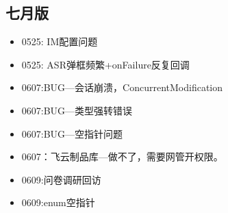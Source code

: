 \documentclass{ctexart}
\begin{document}
	\newpage
	\subsection{七月版}
	\begin{itemize}
		\item 0525: IM配置问题
		\item 0525: ASR弹框频繁+onFailure反复回调
		
		\item 0607:BUG—会话崩溃，ConcurrentModification
		\item 0607:BUG—类型强转错误
		\item 0607:BUG—空指针问题
		\item 0607：飞云制品库—做不了，需要网管开权限。
		
		\item 0609:问卷调研回访
		\item 0609:enum空指针
		

\end{itemize}
\end{document}
